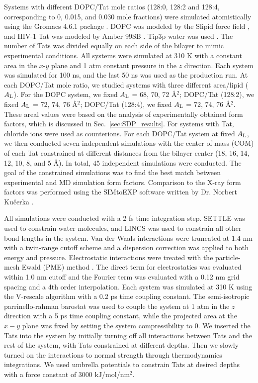 Systems with different DOPC/Tat mole ratios (128:0, 128:2 and 128:4, corresponding to
0, 0.015, and 0.030 mole fractions) were simulated atomistically using the Gromacs 4.6.1
package \cite{Hess08}. 
DOPC was modeled by the Slipid force field 
\cite{Jambeck12_JPCB,Jambeck12_JCTC},
and HIV-1 Tat was modeled by Amber 99SB \cite{Hornak06}. 
Tip3p water was used \cite{Jorgensen83}. The number of Tats was divided equally on
each side of the bilayer to mimic experimental conditions. All systems were simulated at 310 K
with a constant area in the $x$-$y$ plane and 1 atm constant pressure in the $z$ direction. Each
system was simulated for 100 ns, and the last 50 ns was used as the production run.
At each DOPC/Tat mole ratio, we studied systems with three different area/lipid ($A_\textrm{L}$).
For the DOPC system, we fixed $A_\textrm{L}$ = 68, 70, 72 \AA$^2$; 
DOPC/Tat (128:2), we fixed $A_\textrm{L}$ = 72, 74, 76 \AA$^2$; 
DOPC/Tat (128:4), we fixed $A_\textrm{L}$ = 72, 74, 76 \AA$^2$. 
These areal values were based on the analysis of experimentally obtained form 
factors, which is discussed in Sec.~\ref{sec:SDP_results}.
For systems with Tat, chloride ions were used as counterions.
For each DOPC/Tat system at fixed $A_\textrm{L}$, 
we then conducted seven independent simulations with the center of mass (COM) of
each Tat constrained at different distances from the bilayer center 
(18, 16, 14, 12, 10, 8, and 5 \AA). 
In total, 45 independent simulations were conducted. 
The goal of the constrained simulations was to find the best match between 
experimental and MD simulation form factors. Comparison to
the X-ray form factors was performed using the SIMtoEXP software 
written by Dr. Norbert Ku\v{c}erka \cite{Kucerka10}. 

All simulations were conducted with a 2 fs time integration step. 
SETTLE \cite{Miyamoto92} was used
to constrain water molecules, and LINCS \cite{Hess97} was used to constrain all other bond lengths in the
system. 
Van der Waals interactions were truncated at 1.4 nm with a twin-range cutoff scheme and a
dispersion correction was applied to both energy and pressure. Electrostatic interactions were
treated with the particle-mesh Ewald (PME) method \cite{Darden93}. The direct term for electrostatics was
evaluated within 1.0 nm cutoff and the Fourier term was evaluated with a 0.12 nm grid spacing
and a 4th order interpolation. Each system was simulated at 310 K using the V-rescale
algorithm \cite{Bussi07} with a 0.2 ps time coupling constant. The semi-isotropic parrinello-rahman barostat
\cite{Parrinello81} was used to couple the system at 1 atm in the $z$ direction with a 5 ps time coupling constant,
while the projected area at the $x-y$ plane was fixed by setting the system compressibility to 0.
We inserted the Tats into the system by initially turning off all interactions between Tats and the
rest of the system, with Tats constrained at different depths. Then we slowly turned on the
interactions to normal strength through thermodynamics integrations. We used umbrella
potentials to constrain Tats at desired depths with a force constant of 3000 kJ/mol/nm$^2$.

